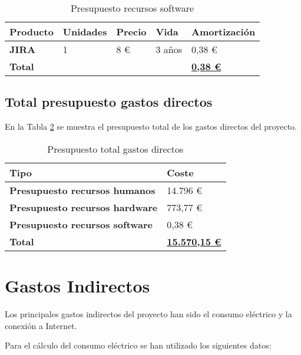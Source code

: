 \begin{table}[H]\label{tab:preprecsw}
	\centering
	\begin{tabular}{|l|l|l|l|l|}
		\hline
		\textbf{Producto} & \textbf{Unidades} & \textbf{Precio} & \textbf{Vida} & \textbf{Amortización} \\ \hline
		\textbf{JIRA}     & 1                 & 8 € \cite{Tfg:jiraprice} & 3 años        & 0,38 €                \\ \hline
		\multicolumn{4}{|l|}{\textbf{Total}} & \textbf{\underline{0,38 €}}                               \\ \hline
	\end{tabular}
	\caption{Presupuesto recursos software}
\end{table}

\subsection{Total presupuesto gastos directos}
En la Tabla \ref{tab:preptotal} se muestra el presupuesto total de los gastos directos del proyecto.

\begin{table}[H]\label{tab:preptotal}
	\centering
	\begin{tabular}{|l|l|}
		\hline
		\textbf{Tipo}                          & \textbf{Coste}                   \\ \hline
		\textbf{Presupuesto recursos humanos}  & 14.796 €                         \\ \hline
		\textbf{Presupuesto recursos hardware} & 773,77 €                         \\ \hline
		\textbf{Presupuesto recursos software} &0,38 €                            \\ \hline
		\textbf{Total}                         & \textbf{\underline{15.570,15 €}} \\ \hline
	\end{tabular}
	\caption{Presupuesto total gastos directos}
\end{table}

\section{Gastos Indirectos}\label{sec:gastosin}

Los principales gastos indirectos del proyecto han sido el consumo eléctrico y la conexión a Internet. 

Para el cálculo del consumo eléctrico se han utilizado los siguientes datos:

